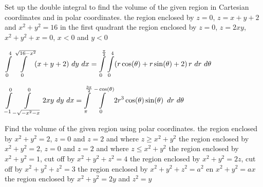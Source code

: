 \begin{Exercise} Set up the double integral to find the volume of the given region in Cartesian coordinates and in polar coordinates.
    \Question[difficulty = 1] the region enclosed by $z=0$, $z=x+y+2$ and $x^2+y^2=16$ in the first quadrant
    \Question[difficulty = 2] the region enclosed by $z=0$, $z=2xy$, $x^2+y^2+x=0$, $x < 0$ and $y<0$
\end{Exercise}

\begin{Answer}
     
        \Question $\displaystyle \int\limits_0^4\displaystyle \int\limits_{0}^{\sqrt{16-x^2}} (x+y+2)  \ dy\  dx = \displaystyle \int\limits_0^{\frac{\pi}{2}} \displaystyle \int\limits_0^{4} (r \cos(\theta) + r \sin(\theta) + 2 )\, r \ dr \ d\theta$ 
     
        \Question $\displaystyle \int\limits_{-1}^0\displaystyle \int\limits_{-\sqrt{-x^2-x}}^{0} 2xy \ dy\  dx = \displaystyle \int\limits_{\pi}^{\frac{3\pi}{2}} \displaystyle \int\limits_0^{-\cos(\theta)} 2r^3 \cos(\theta) \sin(\theta)\, \ dr \ d\theta$ 
       
    
\end{Answer}

\begin{Exercise} Find the volume of the given region using polar coordinates.
    \Question[difficulty = 2] the region enclosed by $x^2+y^2=2$, $z=0$ and $z=2$ and where $z\geq x^2+y^2$
    \Question[difficulty = 2] the region enclosed by $x^2+y^2=2$, $z=0$ and $z=2$ and where $z\leq x^2+y^2$
     \Question[difficulty = 2] the region enclosed by $x^2+y^2=1$, cut off by $x^2+y^2+z^2=4$ 
    \Question[difficulty = 2] the region enclosed by $x^2+y^2=2z$, cut off by $x^2+y^2+z^2=3$
    \Question[difficulty = 3] the region enclosed by $x^2+y^2+z^2=a^2$ en $x^2+y^2=ax$ 
    \Question[difficulty = 3] the region enclosed by $x^2+y^2=2y$ and $z^2=y$ 
\end{Exercise}

